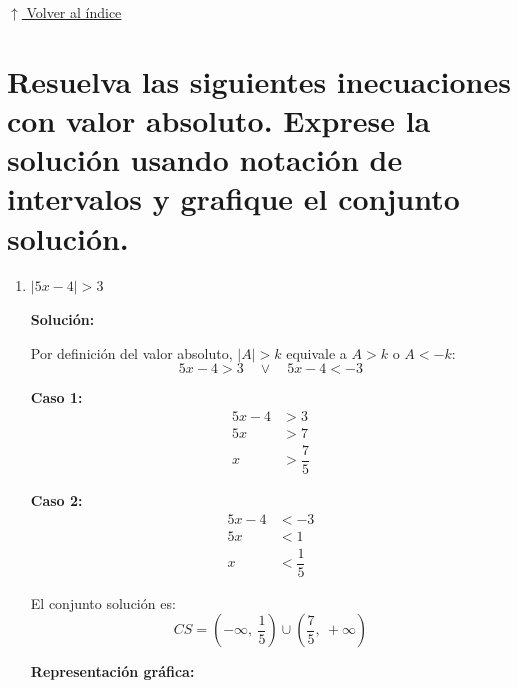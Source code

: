\documentclass[12pt]{article}
\newcommand{\solucion}{%
    \vspace{0.8em}%
    \textbf{Solución:}%
}
\newcommand{\volverindice}{%
    \vspace{1em}%
    \begin{flushright}%
        \hyperlink{indice}{\small $\uparrow$ Volver al índice}%
    \end{flushright}%
}
\begin{document}
\volverindice
\newpage

\section[Inecuaciones con valor absoluto]{Resuelva las siguientes inecuaciones con valor absoluto. Exprese la solución usando notación de intervalos y grafique el conjunto solución.}

\begin{enumerate}[label=\alph*.-]

    \item $|5x - 4| > 3$

    \solucion

    Por definición del valor absoluto, $|A| > k$ equivale a $A > k$ o $A < -k$:
    \[
    5x - 4 > 3 \quad \lor \quad 5x - 4 < -3
    \]

    \textbf{Caso 1:}
    \begin{align*}
    5x - 4 &> 3 \\[0.3em]
    5x &> 7 \\[0.3em]
    x &> \dfrac{7}{5}
    \end{align*}

    \textbf{Caso 2:}
    \begin{align*}
    5x - 4 &< -3 \\[0.3em]
    5x &< 1 \\[0.3em]
    x &< \dfrac{1}{5}
    \end{align*}

    El conjunto solución es:
    \[
    \boxed{CS = \left(-\infty,\ \dfrac{1}{5}\right) \cup \left(\dfrac{7}{5},\ +\infty\right)}
    \]

    \textbf{Representación gráfica:}

    \begin{center}
    \end{center}


\end{enumerate}
\end{document}
